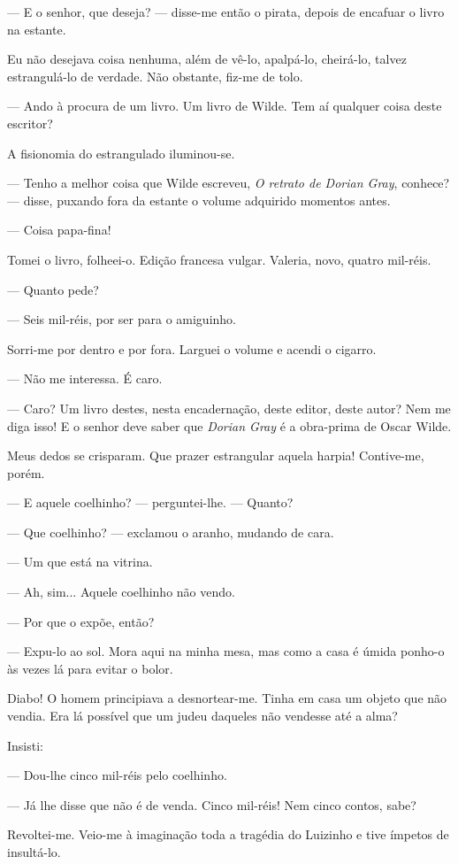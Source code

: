 --- E o senhor, que deseja? --- disse-me então o pirata, depois de
encafuar o livro na estante.

Eu não desejava coisa nenhuma, além de vê-lo, apalpá-lo, cheirá-lo,
talvez estrangulá-lo de verdade. Não obstante, fiz-me de tolo.

--- Ando à procura de um livro. Um livro de Wilde. Tem aí qualquer coisa
deste escritor?

A fisionomia do estrangulado iluminou-se.

--- Tenho a melhor coisa que Wilde escreveu, \emph{O retrato de Dorian
Gray}, conhece? --- disse, puxando fora da estante o volume adquirido
momentos antes.

--- Coisa papa-fina!

Tomei o livro, folheei-o. Edição francesa vulgar. Valeria, novo, quatro
mil-réis.

--- Quanto pede?

--- Seis mil-réis, por ser para o amiguinho.

Sorri-me por dentro e por fora. Larguei o volume e acendi o cigarro.

--- Não me interessa. É caro.

--- Caro? Um livro destes, nesta encadernação, deste editor, deste
autor? Nem me diga isso! E o senhor deve saber que \emph{Dorian Gray} é
a obra-prima de Oscar Wilde.

Meus dedos se crisparam. Que prazer estrangular aquela harpia!
Contive-me, porém.

--- E aquele coelhinho? --- perguntei-lhe. --- Quanto?

--- Que coelhinho? --- exclamou o aranho, mudando de cara.

--- Um que está na vitrina.

--- Ah, sim... Aquele coelhinho não vendo.

--- Por que o expõe, então?

--- Expu-lo ao sol. Mora aqui na minha mesa, mas como a casa é úmida
ponho-o às vezes lá para evitar o bolor.

Diabo! O homem principiava a desnortear-me. Tinha em casa um objeto que
não vendia. Era lá possível que um judeu daqueles não vendesse até a
alma?

Insisti:

--- Dou-lhe cinco mil-réis pelo coelhinho.

--- Já lhe disse que não é de venda. Cinco mil-réis! Nem cinco contos,
sabe?

Revoltei-me. Veio-me à imaginação toda a tragédia do Luizinho e tive
ímpetos de insultá-lo.

